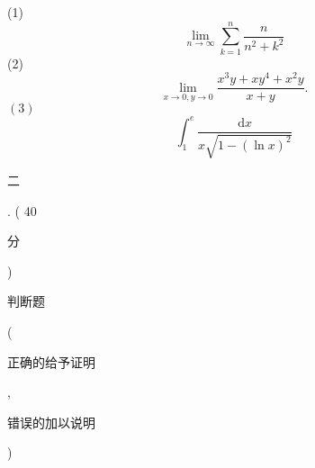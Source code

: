 \documentclass[10pt]{article}
\begin{document}
(1)
$$
\lim _{n \rightarrow \infty} \sum_{k=1}^{n} \frac{n}{n^{2}+k^{2}}
$$
(2)
$$
\lim _{x \rightarrow 0, y \rightarrow 0} \frac{x^{3} y+x y^{4}+x^{2} y}{x+y} .
$$
$(3)$
$$
\int_{1}^{e} \frac{\mathrm{d} x}{x \sqrt{1-(\ln x)^{2}}}
$$
\begin{CJK}{UTF8}{mj}二\end{CJK}. ( 40 \begin{CJK}{UTF8}{mj}分\end{CJK}) \begin{CJK}{UTF8}{mj}判断题\end{CJK} (\begin{CJK}{UTF8}{mj}正确的给予证明\end{CJK}, \begin{CJK}{UTF8}{mj}错误的加以说明\end{CJK})
\end{document}
